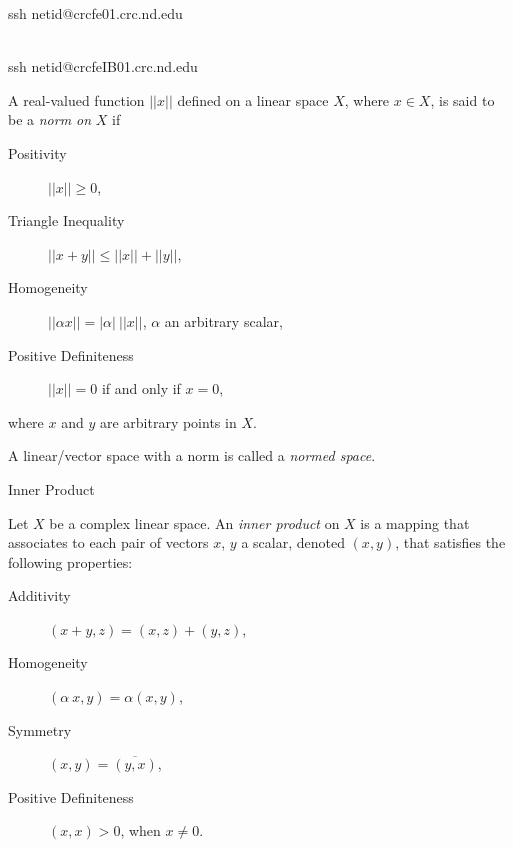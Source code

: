 \documentclass[avery5388,grid,frame]{flashcards}
\begin{document}

\begin{flashcard}{ssh netid@crcfe01.crc.nd.edu

\\ ssh netid@crcfeIB01.crc.nd.edu}

  A real-valued function $||x||$ defined on a linear space $X$, where
  $x \in X$, is said to be a \emph{norm on} $X$ if

  \smallskip

  \begin{description}
    \item [Positivity]            $||x|| \geq 0$,
    \item [Triangle Inequality]   $||x+y|| \leq ||x|| + ||y||$,
    \item [Homogeneity]           $||\alpha x|| = |\alpha| \:  ||x||$,
                                  $\alpha$ an arbitrary scalar,
    \item [Positive Definiteness] $||x|| = 0$ if and only if $x=0$,
  \end{description}

  \smallskip

  where $x$ and $y$ are arbitrary points in $X$.

  \medskip

  A linear/vector space with a norm is called a \emph{normed space}.
\end{flashcard}

\begin{flashcard}[Definition]{Inner Product}

  Let $X$ be a complex linear space. An \emph{inner product} on $X$ is
  a mapping that associates to each pair of vectors $x$, $y$ a scalar,
  denoted $(x,y)$, that satisfies the following properties:

  \medskip

  \begin{description}
    \item [Additivity]            $(x+y,z) = (x,z) + (y,z)$,
    \item [Homogeneity]           $(\alpha \: x, y) = \alpha (x,y)$,
    \item [Symmetry]              $(x,y) = \overline{(y,x)}$,
    \item [Positive Definiteness] $(x,x) > 0$, when $x\neq0$.
  \end{description}
\end{flashcard}
\end{document}
